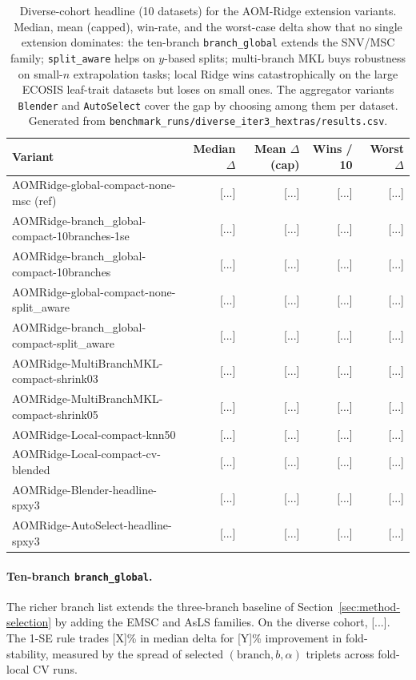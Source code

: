 \begin{table}[t]
\centering
\caption{Diverse-cohort headline (10 datasets) for the AOM-Ridge
extension variants. Median, mean (capped), win-rate, and the worst-case
delta show that no single extension dominates: the ten-branch
\texttt{branch\_global} extends the SNV/MSC family;
\texttt{split\_aware} helps on $y$-based splits; multi-branch MKL
buys robustness on small-$n$ extrapolation tasks; local Ridge wins
catastrophically on the large ECOSIS leaf-trait datasets but loses on
small ones. The aggregator variants \texttt{Blender} and
\texttt{AutoSelect} cover the gap by choosing among them per dataset.
Generated from \texttt{benchmark\_runs/diverse\_iter3\_hextras/results.csv}.}
\label{tab:h-extensions-diverse}
\begin{tabular}{lrrrr}
\toprule
Variant & Median $\Delta$ & Mean $\Delta$ (cap) & Wins / 10 & Worst $\Delta$ \\
\midrule
AOMRidge-global-compact-none-msc (ref) & [...] & [...] & [...] & [...] \\
\midrule
AOMRidge-branch\_global-compact-10branches-1se & [...] & [...] & [...] & [...] \\
AOMRidge-branch\_global-compact-10branches     & [...] & [...] & [...] & [...] \\
AOMRidge-global-compact-none-split\_aware       & [...] & [...] & [...] & [...] \\
AOMRidge-branch\_global-compact-split\_aware    & [...] & [...] & [...] & [...] \\
AOMRidge-MultiBranchMKL-compact-shrink03        & [...] & [...] & [...] & [...] \\
AOMRidge-MultiBranchMKL-compact-shrink05        & [...] & [...] & [...] & [...] \\
AOMRidge-Local-compact-knn50                    & [...] & [...] & [...] & [...] \\
AOMRidge-Local-compact-cv-blended               & [...] & [...] & [...] & [...] \\
\midrule
AOMRidge-Blender-headline-spxy3                 & [...] & [...] & [...] & [...] \\
AOMRidge-AutoSelect-headline-spxy3              & [...] & [...] & [...] & [...] \\
\bottomrule
\end{tabular}
\end{table}

\paragraph{Ten-branch \texttt{branch\_global}.}
The richer branch list extends the three-branch baseline of
Section~\ref{sec:method-selection} by adding the EMSC and AsLS
families. On the diverse cohort, [...]. The 1-SE rule trades [X]\% in
median delta for [Y]\% improvement in fold-stability, measured by
the spread of selected $(\mathrm{branch},b,\alpha)$ triplets across
fold-local CV runs.

